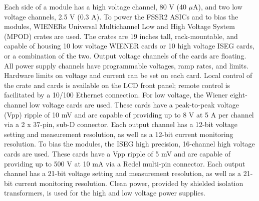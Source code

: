 Each side of a module has a high voltage channel, 80 V (40 $\mu$A), and two low voltage channels, 2.5 V (0.3 A). To power the FSSR2 ASICs and to bias the modules, WIENERs Universal Multichannel Low and High Voltage System (MPOD) crates are used. The crates are 19 inches tall, rack-mountable, and capable of housing 10 low voltage WIENER cards or 10 high voltage ISEG cards, or a combination of the two. Output voltage channels of the cards are floating. All power supply channels have programmable voltages, ramp rates, and limits. Hardware limits on voltage and current can be set on each card. Local control of the crate and cards is available on the LCD front panel; remote control is facilitated by a 10/100 Ethernet connection. For low voltage, the Wiener eight-channel low voltage cards are used. These cards have a peak-to-peak voltage (Vpp) ripple of 10 mV and are capable of providing up to 8 V at 5 A per channel via a 2 x 37-pin, sub-D connector. Each output channel has a 12-bit voltage setting and measurement resolution, as well as a 12-bit current monitoring resolution. To bias the modules, the ISEG high precision, 16-channel high voltage cards are used. These cards have a Vpp ripple of 5 mV and are capable of providing up to 500 V at 10 mA via a Redel multi-pin connector. Each output channel has a 21-bit voltage setting and measurement resolution, as well as a 21-bit current monitoring resolution. Clean power, provided by shielded isolation transformers, is used for the high and low voltage power supplies.

